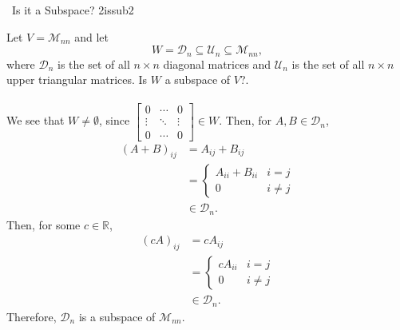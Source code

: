         \begin{example}{\Difficulty\,\Difficulty\,\,Is it a Subspace? 2}{issub2}

            Let \(V=\mathcal{M}_{nn}\) and let
            \begin{equation*}
                W=\mathcal{D}_n\subseteq\mathcal{U}_n\subseteq\mathcal{M}_{nn},
            \end{equation*}
            where \(\mathcal{D}_n\) is the set of all \(n\times n\) diagonal matrices and \(\mathcal{U}_n\) is the set of all \(n\times n\) upper triangular matrices. Is \(W\) a subspace of \(V\)?.
            \\
            \\
            We see that \(W\neq\emptyset\), since \(\begin{bmatrix} 0 & \cdots & 0 \\ \vdots & \ddots & \vdots \\ 0 & \cdots & 0 \end{bmatrix}\in W\). Then,
            for \(A,B\in\mathcal{D}_n\), 
            \begin{align*}
                (A+B)_{ij}&=A_{ij}+B_{ij} \\
                &=\begin{cases}
                    A_{ii}+B_{ii} & i=j \\
                    0 & i \neq j
                \end{cases} \\
                &\in\mathcal{D}_n.
            \end{align*}
            Then, for some \(c\in\mathbb{R}\),
            \begin{align*}
                (cA)_{ij}&=cA_{ij} \\
                &=\begin{cases}
                    cA_{ii} & i=j \\
                    0 & i \neq j
                \end{cases} \\
                &\in\mathcal{D}_n.
            \end{align*}
            Therefore, \(\mathcal{D}_n\) is a subspace of \(\mathcal{M}_{nn}\).
        \end{example}
